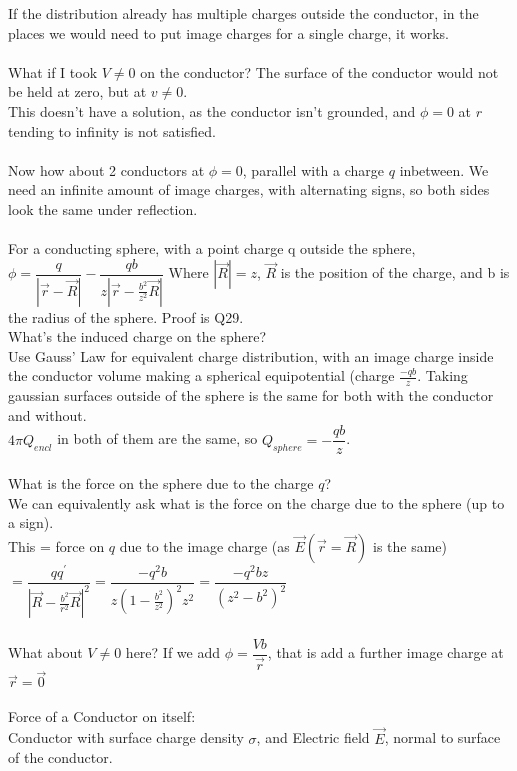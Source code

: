 \documentclass[a4paper,11pt]{article}
\begin{document}
If the distribution already has multiple charges outside the conductor, in the places we would need to put image charges for a single charge, it works.\\
\\
What if I took $V\neq0$ on the conductor? The surface of the conductor would not be held at zero, but at $v\neq0$.\\
This doesn't have a solution, as the conductor isn't grounded, and $\phi=0$ at $r$ tending to infinity is not satisfied.\\
\\
Now how about 2 conductors at $\phi=0$, parallel with a charge $q$ inbetween. We need an infinite amount of image charges, with alternating signs, so both sides look the same under reflection.\\
\\
For a conducting sphere, with a point charge q outside the sphere, $\phi=\dfrac{q}{|\vec{r}-\vec{R}|}-\dfrac{qb}{z|\vec{r}-\frac{b^2}{z^2}\vec{R}|}$
Where $|\vec{R}|=z$, $\vec{R}$ is the position of the charge, and b is the radius of the sphere. Proof is Q29.\\
What's the induced charge on the sphere?\\
Use Gauss' Law for equivalent charge distribution, with an image charge inside the conductor volume making a spherical equipotential (charge $\frac{-qb}{z}$. Taking gaussian surfaces outside of the sphere is the same for both with the conductor and without.\\
$4\pi Q_{encl}$ in both of them are the same, so $Q_{sphere}=-\dfrac{qb}{z}$.\\
\\
What is the force on the sphere due to the charge $q$?\\
We can equivalently ask what is the force on the charge due to the sphere (up to a sign).\\ 
This = force on $q$ due to the image charge (as $\vec{E}(\vec{r}=\vec{R})$ is the same)
$=\dfrac{qq^\prime}{|\vec{R}-\frac{b^2}{r^2}\vec{R}|^2}=\dfrac{-q^2b}{z(1-\frac{b^2}{z^2})^2z^2}=\dfrac{-q^2 bz}{(z^2-b^2)^2}$\\
\\
What about $V\neq0$ here? If we add $\phi=\dfrac{Vb}{\vec{r}}$, that is add a further image charge at $\vec{r}=\vec{0}$\\
\\
Force of a Conductor on itself:\\
Conductor with surface charge density $\sigma$, and Electric field $\vec{E}$, normal to surface of the conductor.\\
\end{document}
